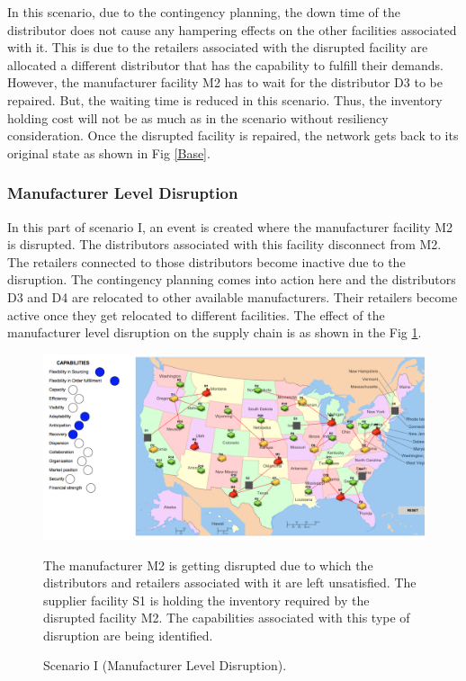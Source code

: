 In this scenario, due to the contingency planning, the down time of the distributor does not cause any hampering effects on the other facilities associated with it. This is due to the retailers associated with the disrupted facility are allocated a different distributor that has the capability to fulfill their demands. However, the manufacturer facility M2 has to wait for the distributor D3 to be repaired. But, the waiting time is reduced in this scenario. Thus, the inventory holding cost will not be as much as in the scenario without resiliency consideration. Once the disrupted facility is repaired, the network gets back to its original state as shown in Fig \ref{Base}. 


\subsubsection{Manufacturer Level Disruption}

In this part of scenario I, an event is created where the manufacturer facility M2 is disrupted. The distributors associated with this facility disconnect from M2. The retailers connected to those distributors become inactive due to the disruption. The contingency planning comes into action here and the distributors D3 and D4 are relocated to other available manufacturers. Their retailers become active once they get relocated to different facilities. The effect of the manufacturer level disruption on the supply chain is as shown in the Fig \ref{S1MLD}. 

\begin{figure}[H]
  \centering
  \includegraphics[width=6.5in]{figures/pdf/S1MLD.png}\\
  \caption{Scenario I (Manufacturer Level Disruption).}
  {The manufacturer M2 is getting disrupted due to which the  distributors and retailers associated with it are left unsatisfied. The supplier facility S1 is holding the inventory required by the disrupted facility M2. The capabilities associated with this type of disruption are being identified.}
  \label{S1MLD}
\end{figure}    

